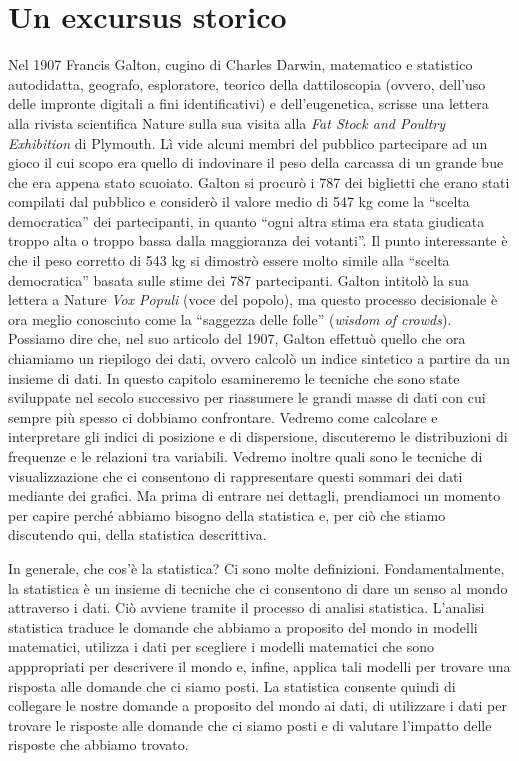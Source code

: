 \documentclass[
  10pt,
  italian,
  a4paper,
  extrafontsizes,onecolumn,openright
  ]{memoir}
\theoremstyle{definition}
\theoremstyle{definition}
\theoremstyle{definition}
\theoremstyle{definition}
\theoremstyle{remark}
\begin{document}
\hypertarget{un-excursus-storico}{%
\section{Un excursus storico}\label{un-excursus-storico}}

Nel 1907 Francis Galton, cugino di Charles Darwin, matematico e
statistico autodidatta, geografo, esploratore, teorico della
dattiloscopia (ovvero, dell'uso delle impronte digitali a fini
identificativi) e dell'eugenetica, scrisse una lettera alla rivista
scientifica Nature sulla sua visita alla \emph{Fat Stock and Poultry
Exhibition} di Plymouth. Lì vide alcuni membri del pubblico partecipare
ad un gioco il cui scopo era quello di indovinare il peso della carcassa
di un grande bue che era appena stato scuoiato. Galton si procurò i 787
dei biglietti che erano stati compilati dal pubblico e considerò il
valore medio di 547 kg come la ``scelta democratica'' dei partecipanti, in
quanto ``ogni altra stima era stata giudicata troppo alta o troppo bassa
dalla maggioranza dei votanti''. Il punto interessante è che il peso
corretto di 543 kg si dimostrò essere molto simile alla ``scelta
democratica'' basata sulle stime dei 787 partecipanti. Galton intitolò la
sua lettera a Nature \emph{Vox Populi} (voce del popolo), ma questo processo
decisionale è ora meglio conosciuto come la ``saggezza delle folle''
(\emph{wisdom of crowds}). Possiamo dire che, nel suo articolo del 1907,
Galton effettuò quello che ora chiamiamo un riepilogo dei dati, ovvero
calcolò un indice sintetico a partire da un insieme di dati. In questo
capitolo esamineremo le tecniche che sono state sviluppate nel secolo
successivo per riassumere le grandi masse di dati con cui sempre più
spesso ci dobbiamo confrontare. Vedremo come calcolare e interpretare
gli indici di posizione e di dispersione, discuteremo le distribuzioni
di frequenze e le relazioni tra variabili. Vedremo inoltre quali sono le
tecniche di visualizzazione che ci consentono di rappresentare questi
sommari dei dati mediante dei grafici. Ma prima di entrare nei dettagli, prendiamoci un momento per capire perché abbiamo bisogno della statistica e, per ciò che stiamo discutendo qui, della statistica descrittiva.

In generale, che cos'è la statistica? Ci sono molte definizioni. Fondamentalmente, la statistica è un insieme di tecniche che ci consentono di dare un senso al mondo attraverso i dati. Ciò avviene tramite il processo di analisi statistica. L'analisi statistica traduce le domande che abbiamo a proposito del mondo in modelli matematici, utilizza i dati per scegliere i modelli matematici che sono apppropriati per descrivere il mondo e, infine, applica tali modelli per trovare una risposta alle domande che ci siamo posti. La statistica consente quindi di collegare le nostre domande a proposito del mondo ai dati, di utilizzare i dati per trovare le risposte alle domande che ci siamo posti e di valutare l'impatto delle risposte che abbiamo trovato.
\end{document}
